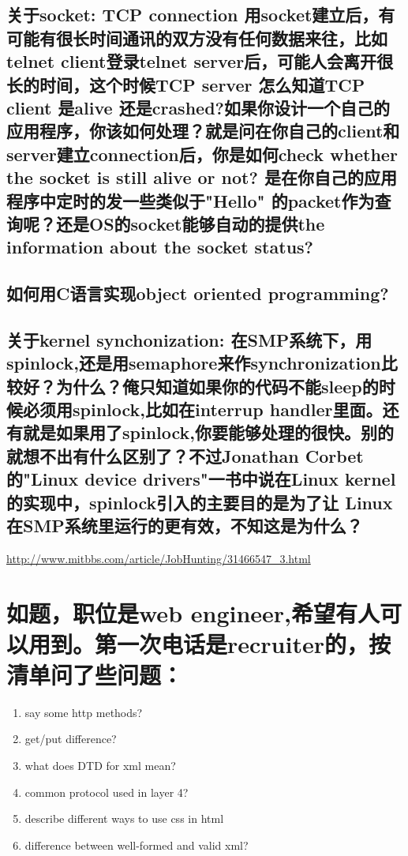 \documentclass[12pt]{book}
\begin{document}
\subsection{关于socket: TCP connection 用socket建立后，有可能有很长时间通讯的双方没有任何数据来往，比如telnet client登录telnet server后，可能人会离开很长的时间，这个时候TCP server 怎么知道TCP client 是alive 还是crashed?如果你设计一个自己的应用程序，你该如何处理？就是问在你自己的client和server建立connection后，你是如何check whether the socket is still alive or not? 是在你自己的应用程序中定时的发一些类似于"Hello" 的packet作为查询呢？还是OS的socket能够自动的提供the information about the socket status?}
\label{sec-13-23-4}

\subsection{如何用C语言实现object oriented programming?}
\label{sec-13-23-5}

\subsection{关于kernel synchonization: 在SMP系统下，用spinlock,还是用semaphore来作synchronization比较好？为什么？俺只知道如果你的代码不能sleep的时候必须用spinlock,比如在interrup handler里面。还有就是如果用了spinlock,你要能够处理的很快。别的就想不出有什么区别了？不过Jonathan Corbet的"Linux device drivers"一书中说在Linux kernel 的实现中，spinlock引入的主要目的是为了让 Linux在SMP系统里运行的更有效，不知这是为什么？}
\label{sec-13-23-6}

\url{http://www.mitbbs.com/article/JobHunting/31466547_3.html}

\section{如题，职位是web engineer,希望有人可以用到。第一次电话是recruiter的，按清单问了些问题：}
\label{sec-13-24}
\begin{enumerate}
\item say some http methods?
\item get/put difference?
\item what does DTD for xml mean?
\item common protocol used in layer 4?
\item describe different ways to use css in html
\item difference between well-formed and valid xml?
\end{enumerate}
\end{document}
